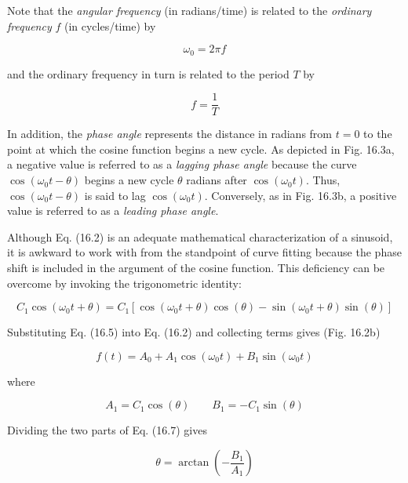 \documentclass[../main.tex]{subfiles}
\begin{document}
Note that the \textit{angular frequency} (in radians/time) is related to the \textit{ordinary frequency} $f$ (in cycles/time) by %

\begin{equation}
	\tag{16.3}
	\omega_0 = 2 \pi f
\end{equation}

\noindent and the ordinary frequency in turn is related to the period $T$ by

\begin{equation}
	\tag{16.4}
	f = \frac{1}{T}
\end{equation}

In addition, the \textit{phase angle} represents the distance in radians from $t = 0$ to the point at which the cosine function begins a new cycle. As depicted in Fig. 16.3a, a negative value is referred to as a \textit{lagging phase angle} because the curve $\cos(\omega_0 t - \theta)$ begins a new cycle $\theta$ radians after $\cos(\omega_0 t)$. Thus, $\cos(\omega_0 t - \theta)$ is said to lag $\cos(\omega_0 t)$. Conversely, as in Fig. 16.3b, a positive value is referred to as a \textit{leading phase angle}.

Although Eq. (16.2) is an adequate mathematical characterization of a sinusoid, it is awkward to work with from the standpoint of curve fitting because the phase shift is included in the argument of the cosine function. This deficiency can be overcome by invoking the trigonometric identity:

\begin{equation}
	\tag{16.5}
	C_1 \cos(\omega_0 t + \theta) = C_1 [\cos(\omega_0 t + \theta) \cos(\theta) - \sin(\omega_0 t + \theta) \sin(\theta)]
\end{equation}

\noindent Substituting Eq. (16.5) into Eq. (16.2) and collecting terms gives (Fig. 16.2b)

\begin{equation}
	\tag{16.6}
	f(t) = A_0 + A_1 \cos(\omega_0 t) + B_1 \sin(\omega_0 t)
\end{equation}

\noindent where

\begin{equation}
	\tag{16.7}
	A_1 = C_1 \cos(\theta) \quad \quad B_1 = - C_1 \sin(\theta)
\end{equation}

\noindent Dividing the two parts of Eq. (16.7) gives

\begin{equation}
	\tag{16.8}
	\theta = \arctan (- \frac{B_1}{A_1})
\end{equation}
\end{document}
